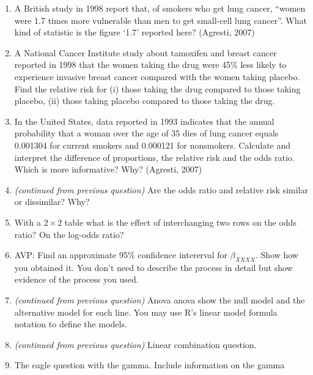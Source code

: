 \documentclass[
]{article}
\begin{document}
\begin{enumerate}
\item
  A British study in 1998 report that, of smokers who get lung cancer,
  ``women were 1.7 times more vulnerable than men to get small-cell lung
  cancer''. What kind of statistic is the figure `1.7' reported here?
  (Agresti, 2007) \vspace{0px}
\item
  A National Cancer Institute study about tamoxifen and breast cancer
  reported in 1998 that the women taking the drug were 45\% less likely
  to experience invasive breast cancer compared with the women taking
  placebo. Find the relative risk for (i) those taking the drug compared
  to those taking placebo, (ii) those taking placebo compared to those
  taking the drug. \vspace{0px}
\item
  In the United States, data reported in 1993 indicates that the annual
  probability that a woman over the age of 35 dies of lung cancer equals
  0.001304 for current smokers and 0.000121 for nonsmokers. Calculate
  and interpret the difference of proportions, the relative risk and the
  odds ratio. Which is more informative? Why? (Agresti, 2007)
  \vspace{0px}
\item
  \emph{(continued from previous question)} Are the odds ratio and
  relative risk similar or dissimilar? Why? \vspace{0px}
\item
  With a \(2 \times 2\) table what is the effect of interchanging two
  rows on the odds ratio? On the log-odds ratio? \vspace{0px}
\item
  AVP: Find an approximate 95\% confidence intererval for
  \(\beta_{XXXX}\). Show how you obtained it. You don't need to describe
  the process in detail but show evidence of the process you used.
  \vspace{0px}
\item
  \emph{(continued from previous question)} Anova anova show the null
  model and the alternative model for each line. You may use R's linear
  model formula notation to define the models. \vspace{0px}
\item
  \emph{(continued from previous question)} Linear combination question.
  \vspace{0px}
\item
  The eagle question with the gamma. Include information on the gamma
  \newpage \vspace{0px}

\end{enumerate}
\end{document}
